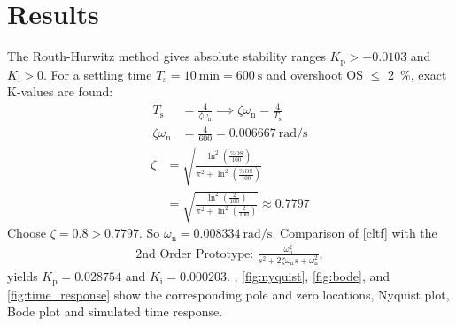 \documentclass[10pt, a4paper, twocolumn]{article}
\newcommand{\upsub}[1]{_{\mathrm{#1}}}
\begin{document}
	\section{Results}
	The Routh-Hurwitz method gives absolute stability ranges $K\upsub{p}>-0.0103$ and $K\upsub{i}>0$. For a settling time $T\upsub{s}=\qty{10}{\minute}=\qty{600}{\second}$ and overshoot OS $\leq$ \qty{2}{\percent}, exact K-values are found:
	\begin{equation}
		\begin{aligned}
			T_{\mathrm{s}} &= \frac{4}{\zeta \omega_{\mathrm{n}}} \implies \zeta \omega_{\mathrm{n}}=\frac{4}{T_{\mathrm{s}}} \\
			\zeta \omega_{\mathrm{n}} &= \frac{4}{600} = \qty{0.006667}{\radian\per\second}
		\end{aligned}
	\end{equation}
	\begin{equation}
		\begin{aligned}
			\zeta &=\sqrt{\frac{\ln^2{\left(\frac{\%\text{OS}}{100}\right)}}{\pi^2 + \ln^2{\left(\frac{\%\text{OS}}{100}\right)}}} \\
			&=\sqrt{\frac{\ln^2{\left(\frac{2}{100}\right)}}{\pi^2 + \ln^2{\left(\frac{2}{100}\right)}}}\approx0.7797
		\end{aligned}
	\end{equation}
	Choose $\zeta=0.8>0.7797$. So $\omega\upsub{n}=\qty{0.008334}{\radian\per\second}$. Comparison of \cref{cltf} with the
	\begin{equation}
		\begin{aligned}
			\text{2nd Order Prototype: }\frac{\omega\upsub{n}^2}{s^2 +2\zeta\omega_{\mathrm{n}}s + \omega_{\mathrm{n}}^2},
		\end{aligned}
	\end{equation}
	yields $K\upsub{p}=0.028754$ and $K\upsub{i}=0.000203$. , \ref{fig:nyquist}, \ref{fig:bode}, and \ref{fig:time_response} show the corresponding pole and zero locations, Nyquist plot, Bode plot and simulated time response.
	
\end{document}
